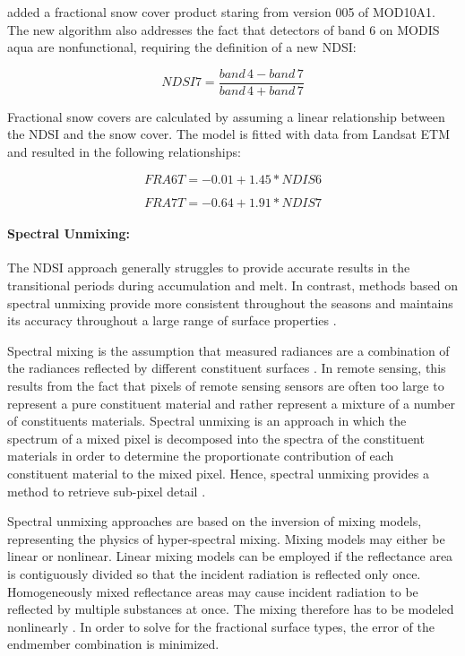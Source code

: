 \documentclass[a4paper,10pt]{article}
\begin{document}
\cite{Salomonson2006, Salomonson2004} added a fractional snow cover product staring from version 005 of MOD10A1. The new algorithm also addresses the fact that detectors of band 6 on \gls{MODIS} aqua are nonfunctional, requiring the definition of a new \gls{NDSI}:

\begin{equation}
 NDSI7 = \frac{band \, 4 -band \, 7}{band \, 4 + band \, 7}
\end{equation}

Fractional snow covers are calculated by assuming a linear relationship between the \gls{NDSI} and the snow cover. The model is fitted with data from Landsat \gls{ETM} and resulted in the following relationships:

\begin{equation}
    FRA6T = -0.01 + 1.45 * NDIS6
\end{equation}

\begin{equation}
    FRA7T = -0.64 + 1.91 * NDIS7
\end{equation}

\paragraph{Spectral Unmixing:}
The \gls{NDSI} approach generally struggles to provide accurate results in the transitional periods during accumulation and melt. In contrast, methods based on spectral unmixing provide more consistent throughout the seasons and maintains its accuracy throughout a large range of surface properties \citep{Rittger2013}.

Spectral mixing is the assumption that measured radiances are a combination of the radiances reflected by different constituent surfaces \citep{Dozier2004}.
In remote sensing, this results from the fact that pixels of remote sensing sensors are often too large to represent a pure constituent material and rather represent a mixture of a number of constituents materials. Spectral unmixing is an approach in which the spectrum of a mixed pixel is decomposed into the spectra of the constituent materials in order to determine the proportionate contribution of each constituent material to the mixed pixel. Hence, spectral unmixing provides a method to retrieve sub-pixel detail \citep{Keshava2003}.

Spectral unmixing approaches are based on the inversion of mixing models, representing the physics of hyper-spectral mixing. Mixing models may either be linear or nonlinear. Linear mixing models can be employed if the reflectance area is contiguously divided so that the incident radiation is reflected only once. Homogeneously mixed reflectance areas may cause incident radiation to be reflected by multiple substances at once. The mixing therefore has to be modeled nonlinearly \citep{Keshava2003}.
In order to solve for the fractional surface types, the error of the endmember combination is minimized.
\end{document}
